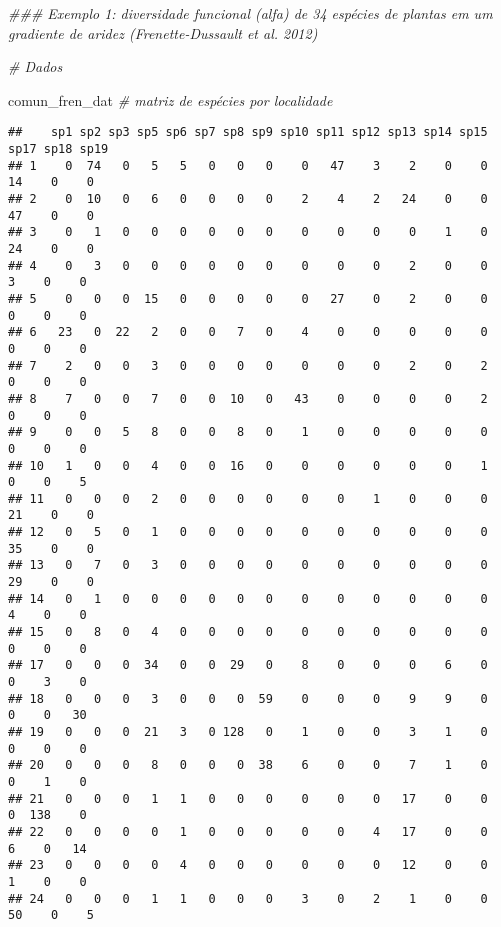 \documentclass[
]{book}
\newenvironment{Shaded}{\begin{snugshade}}{\end{snugshade}}
\newcommand{\CommentTok}[1]{\textcolor[rgb]{0.56,0.35,0.01}{\textit{#1}}}
\newcommand{\NormalTok}[1]{#1}
\begin{document}
\begin{Shaded}
\begin{Highlighting}[]
\CommentTok{### Exemplo 1: diversidade funcional (alfa) de 34 espécies de plantas em um gradiente de aridez (Frenette-Dussault et al. 2012)}


\CommentTok{# Dados}

\NormalTok{comun_fren_dat }\CommentTok{# matriz de espécies por localidade}
\end{Highlighting}
\end{Shaded}

\begin{verbatim}
##    sp1 sp2 sp3 sp5 sp6 sp7 sp8 sp9 sp10 sp11 sp12 sp13 sp14 sp15 sp17 sp18 sp19
## 1    0  74   0   5   5   0   0   0    0   47    3    2    0    0   14    0    0
## 2    0  10   0   6   0   0   0   0    2    4    2   24    0    0   47    0    0
## 3    0   1   0   0   0   0   0   0    0    0    0    0    1    0   24    0    0
## 4    0   3   0   0   0   0   0   0    0    0    0    2    0    0    3    0    0
## 5    0   0   0  15   0   0   0   0    0   27    0    2    0    0    0    0    0
## 6   23   0  22   2   0   0   7   0    4    0    0    0    0    0    0    0    0
## 7    2   0   0   3   0   0   0   0    0    0    0    2    0    2    0    0    0
## 8    7   0   0   7   0   0  10   0   43    0    0    0    0    2    0    0    0
## 9    0   0   5   8   0   0   8   0    1    0    0    0    0    0    0    0    0
## 10   1   0   0   4   0   0  16   0    0    0    0    0    0    1    0    0    5
## 11   0   0   0   2   0   0   0   0    0    0    1    0    0    0   21    0    0
## 12   0   5   0   1   0   0   0   0    0    0    0    0    0    0   35    0    0
## 13   0   7   0   3   0   0   0   0    0    0    0    0    0    0   29    0    0
## 14   0   1   0   0   0   0   0   0    0    0    0    0    0    0    4    0    0
## 15   0   8   0   4   0   0   0   0    0    0    0    0    0    0    0    0    0
## 17   0   0   0  34   0   0  29   0    8    0    0    0    6    0    0    3    0
## 18   0   0   0   3   0   0   0  59    0    0    0    9    9    0    0    0   30
## 19   0   0   0  21   3   0 128   0    1    0    0    3    1    0    0    0    0
## 20   0   0   0   8   0   0   0  38    6    0    0    7    1    0    0    1    0
## 21   0   0   0   1   1   0   0   0    0    0    0   17    0    0    0  138    0
## 22   0   0   0   0   1   0   0   0    0    0    4   17    0    0    6    0   14
## 23   0   0   0   0   4   0   0   0    0    0    0   12    0    0    1    0    0
## 24   0   0   0   1   1   0   0   0    3    0    2    1    0    0   50    0    5

\end{verbatim}
\end{document}
